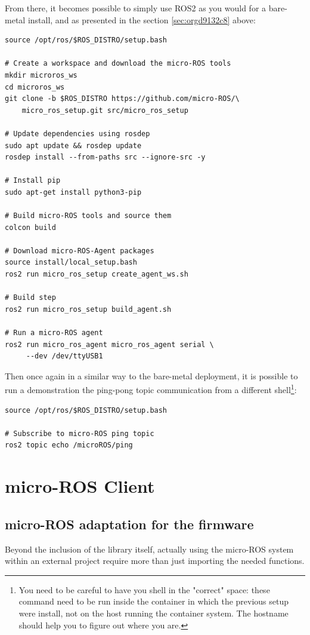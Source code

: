 \documentclass[10pt]{article}
\begin{document}
From there, it becomes possible to simply use ROS2 as you would for a bare-metal install,
and as presented in the section \ref{sec:orgd9132c8} above:
\begin{verbatim}
source /opt/ros/$ROS_DISTRO/setup.bash

# Create a workspace and download the micro-ROS tools
mkdir microros_ws
cd microros_ws
git clone -b $ROS_DISTRO https://github.com/micro-ROS/\
    micro_ros_setup.git src/micro_ros_setup

# Update dependencies using rosdep
sudo apt update && rosdep update
rosdep install --from-paths src --ignore-src -y

# Install pip
sudo apt-get install python3-pip

# Build micro-ROS tools and source them
colcon build

# Download micro-ROS-Agent packages
source install/local_setup.bash
ros2 run micro_ros_setup create_agent_ws.sh

# Build step
ros2 run micro_ros_setup build_agent.sh

# Run a micro-ROS agent
ros2 run micro_ros_agent micro_ros_agent serial \
     --dev /dev/ttyUSB1
\end{verbatim}

Then once again in a similar way to the bare-metal deployment,  it is possible to run a demonstration
the ping-pong topic communication from a different shell\footnote{You need to be careful to have you shell in the "correct" space: these command need to be run inside
the container in which the previous setup were install, not on the host running the container system.
The hostname should help you to figure out where you are.}:
\begin{verbatim}
source /opt/ros/$ROS_DISTRO/setup.bash

# Subscribe to micro-ROS ping topic
ros2 topic echo /microROS/ping
\end{verbatim}
\clearpage
\section{micro-ROS Client}
\label{sec:orgb6742c7}
\subsection{micro-ROS adaptation for the firmware}
\label{sec:org17b5197}
Beyond the inclusion of the library itself, actually using the micro-ROS system
within an external project require more than just importing the needed
functions.
\end{document}
